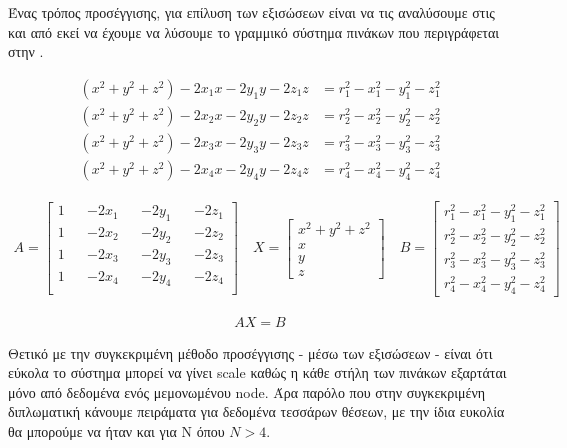 Ένας τρόπος προσέγγισης, για επίλυση των εξισώσεων  είναι να τις αναλύσουμε στις  
και από εκεί να έχουμε να λύσουμε το γραμμικό σύστημα πινάκων που περιγράφεται στην  \cite{Multilateration-Solution}.

\begin{align}
	(x^2+y^2+z^2) - 2x_1x - 2y_1y - 2z_1z &= r_1^2 - x_1^2 - y_1^2 - z_1^2 \label{eq:multilateration-pha2} \\ 
	(x^2+y^2+z^2) - 2x_2x - 2y_2y - 2z_2z &= r_2^2 - x_2^2 - y_2^2 - z_2^2 \nonumber \\
	(x^2+y^2+z^2) - 2x_3x - 2y_3y - 2z_3z &= r_3^2 - x_3^2 - y_3^2 - z_3^2 \nonumber \\
	(x^2+y^2+z^2) - 2x_4x - 2y_4y - 2z_4z &= r_4^2 - x_4^2 - y_4^2 - z_4^2 \nonumber
\end{align}


\begin{align}
	A = \begin{bmatrix} 1 && -2x_1 && -2y_1 && -2z_1 \\ 1 && -2x_2 && -2y_2 && -2z_2 \\ 1 && -2x_3 && -2y_3 && -2z_3 \\ 1 && -2x_4 && -2y_4 && -2z_4 \\\end{bmatrix} \nonumber \quad
	X = \begin{bmatrix} x^2+y^2+z^2 \\x \\ y \\ z \end{bmatrix} \nonumber \quad
	B = \begin{bmatrix} r_1^2 - x_1^2 - y_1^2 - z_1^2 \\ r_2^2 - x_2^2 - y_2^2 - z_2^2 \\ r_3^2 - x_3^2 - y_3^2 - z_3^2 \\ r_4^2 - x_4^2 - y_4^2 - z_4^2 \end{bmatrix} \nonumber
\end{align}

\begin{align}
	AX = B \label{eq:multilateration-linear-system}
\end{align}

Θετικό με την συγκεκριμένη μέθοδο προσέγγισης - μέσω των εξισώσεων  - είναι ότι εύκολα το σύστημα μπορεί να γίνει scale καθώς η κάθε στήλη των πινάκων εξαρτάται μόνο από δεδομένα ενός μεμονωμένου node. Άρα παρόλο που στην συ\-γκε\-κρι\-μένη διπλωματική κάνουμε πειράματα για δεδομένα τεσσάρων θέσεων, με την ίδια ευκολία θα μπορούμε να ήταν και για N όπου $N>4$.

